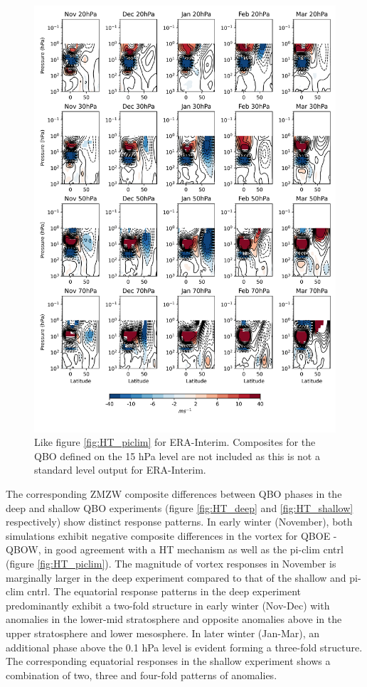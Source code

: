 \newpage 
\begin{figure}[h!]
\begin{center}
\noindent\includegraphics[width = 0.85\linewidth]{Figures/Figures-deepQBO/LAGGED_ZMZW_composites_by_month_QBO_phases_U_ERA_MarQBO_vs_Mar_70hPa_5thresh.png}
\caption[ZMZW composites under different QBO phases in ERA-Interim]{Like figure \ref{fig:HT_piclim} for ERA-Interim. Composites for the QBO defined on the 15 hPa level are not included as this is not a standard level output for ERA-Interim. }
\label{fig:HT_ERA}
\end{center}
\end{figure}

The corresponding ZMZW composite differences between QBO phases in the deep and shallow QBO experiments (figure \ref{fig:HT_deep} and \ref{fig:HT_shallow} respectively) show distinct response patterns. In early winter (November), both simulations exhibit negative composite differences in the vortex for QBOE - QBOW, in good agreement with a HT mechanism \citep{HoltonJamesRTan1980} as well as the pi-clim cntrl (figure \ref{fig:HT_piclim}). The magnitude of vortex responses in November is marginally larger in the deep experiment compared to that of the shallow and pi-clim cntrl. The equatorial response patterns in the deep experiment predominantly exhibit a two-fold structure in early winter (Nov-Dec) with anomalies in the lower-mid stratosphere and opposite anomalies above in the upper stratosphere and lower mesosphere. In later winter (Jan-Mar), an additional phase above the 0.1 hPa level is evident forming a three-fold structure. The corresponding equatorial responses in the shallow experiment shows a combination of two, three and four-fold patterns of anomalies. 

